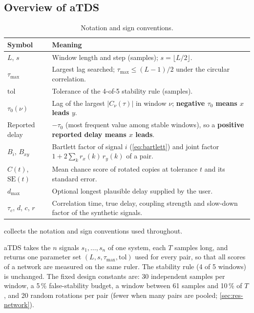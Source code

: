 \documentclass[11pt,a4paper]{article}
\begin{document}
\subsection{Overview of aTDS}
\begin{table}[t]
\centering
\caption{Notation and sign conventions.}
\label{tab:notation}
\footnotesize
\begin{tabularx}{\textwidth}{>{\raggedright\arraybackslash}p{2.6cm}>{\raggedright\arraybackslash}X}
\toprule
Symbol & Meaning \\
\midrule
$L$, $s$ & Window length and step (samples); $s = \lfloor L/2 \rfloor$. \\
$\tau_{\max}$ & Largest lag searched; $\tau_{\max} \le (L-1)/2$ under the circular correlation. \\
$\mathrm{tol}$ & Tolerance of the 4-of-5 stability rule (samples). \\
$\tau_0(\nu)$ & Lag of the largest $|C_\nu(\tau)|$ in window $\nu$; \textbf{negative $\tau_0$ means $x$ leads $y$}. \\
Reported delay & $-\tau_0$ (most frequent value among stable windows), so a \textbf{positive reported delay means $x$ leads}. \\
$B_i$, $B_{xy}$ & Bartlett factor of signal $i$ (\cref{eq:bartlett}) and joint factor $1 + 2\sum_k r_x(k)\,r_y(k)$ of a pair. \\
$C(t)$, $\mathrm{SE}(t)$ & Mean chance score of rotated copies at tolerance $t$ and its standard error. \\
$d_{\max}$ & Optional longest plausible delay supplied by the user. \\
$\tau_c$, $d$, $c$, $r$ & Correlation time, true delay, coupling strength and slow-down factor of the synthetic signals. \\
\bottomrule
\end{tabularx}
\end{table}
 collects the notation and sign conventions used throughout.

aTDS takes the $n$ signals $s_1, \dots, s_n$ of one system, each $T$ samples long, and returns one parameter set $(L, s, \tau_{\max}, \mathrm{tol})$ used for every pair, so that all scores of a network are measured on the same ruler. The stability rule (4 of 5 windows) is unchanged. The fixed design constants are: 30 independent samples per window, a 5\,\% false-stability budget, a window between 61 samples and 10\,\% of $T$, and 20 random rotations per pair (fewer when many pairs are pooled; \cref{sec:res-network}).
\end{document}

